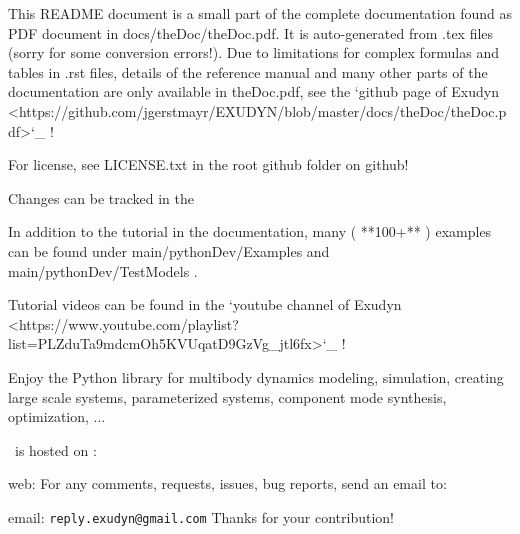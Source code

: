 {This README document is a small part of the complete documentation found as PDF document in docs/theDoc/theDoc.pdf.
It is auto-generated from .tex files (sorry for some conversion errors!). 
Due to limitations for complex formulas and tables in .rst files, details of the reference manual and many other parts of the documentation are only available in theDoc.pdf, see the `github page of Exudyn <https://github.com/jgerstmayr/EXUDYN/blob/master/docs/theDoc/theDoc.pdf>`_ !

For license, see LICENSE.txt in the root github folder on github!

Changes can be tracked in the 

In addition to the tutorial in the documentation, many ( **100+** ) examples can be found under main/pythonDev/Examples and main/pythonDev/TestModels .

Tutorial videos can be found in the `youtube channel of Exudyn <https://www.youtube.com/playlist?list=PLZduTa9mdcmOh5KVUqatD9GzVg_jtl6fx>`_ !

Enjoy the Python library for multibody dynamics modeling, simulation, creating large scale systems, parameterized systems, component mode synthesis, optimization, ...
}
%
%

%
\noindent \codeName\ is hosted on  \cite{EXUDYNgit}:
\bi
  \item web: 
\ei
%
For any comments, requests, issues, bug reports, send an email to: 
\bi
  \item email: \texttt{reply.exudyn@gmail.com}
\ei
Thanks for your contribution!


